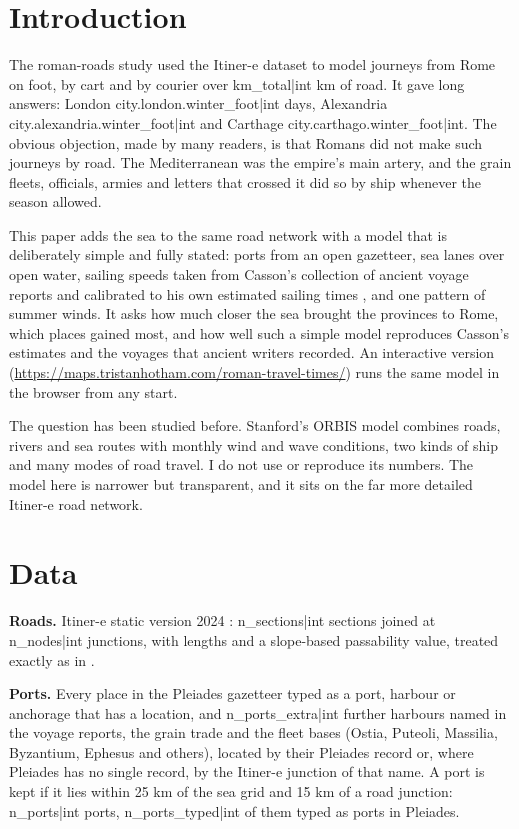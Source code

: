 \documentclass[11pt,a4paper]{article}
\begin{document}
\section{Introduction}
The roman-roads study \citep{hotham2026} used the Itiner-e dataset \citep{itinere,desoto2025} to model journeys from Rome on foot, by cart and by courier over {{km_total|int}} km of road. It gave long answers: London {{city.london.winter_foot|int}} days, Alexandria {{city.alexandria.winter_foot|int}} and Carthage {{city.carthago.winter_foot|int}}. The obvious objection, made by many readers, is that Romans did not make such journeys by road. The Mediterranean was the empire's main artery, and the grain fleets, officials, armies and letters that crossed it did so by ship whenever the season allowed.

This paper adds the sea to the same road network with a model that is deliberately simple and fully stated: ports from an open gazetteer, sea lanes over open water, sailing speeds taken from Casson's collection of ancient voyage reports and calibrated to his own estimated sailing times \citep{casson1951}, and one pattern of summer winds. It asks how much closer the sea brought the provinces to Rome, which places gained most, and how well such a simple model reproduces Casson's estimates and the voyages that ancient writers recorded. An interactive version (\url{https://maps.tristanhotham.com/roman-travel-times/}) runs the same model in the browser from any start.

The question has been studied before. Stanford's ORBIS model \citep{orbis,scheidel2014,scheidel2015} combines roads, rivers and sea routes with monthly wind and wave conditions, two kinds of ship and many modes of road travel. I do not use or reproduce its numbers. The model here is narrower but transparent, and it sits on the far more detailed Itiner-e road network.

\section{Data}
\textbf{Roads.} Itiner-e static version 2024 \citep{itinere}: {{n_sections|int}} sections joined at {{n_nodes|int}} junctions, with lengths and a slope-based passability value, treated exactly as in \citet{hotham2026}.

\textbf{Ports.} Every place in the Pleiades gazetteer \citep{pleiades} typed as a port, harbour or anchorage that has a location, and {{n_ports_extra|int}} further harbours named in the voyage reports, the grain trade and the fleet bases (Ostia, Puteoli, Massilia, Byzantium, Ephesus and others), located by their Pleiades record or, where Pleiades has no single record, by the Itiner-e junction of that name. A port is kept if it lies within 25 km of the sea grid and 15 km of a road junction: {{n_ports|int}} ports, {{n_ports_typed|int}} of them typed as ports in Pleiades.
\end{document}
